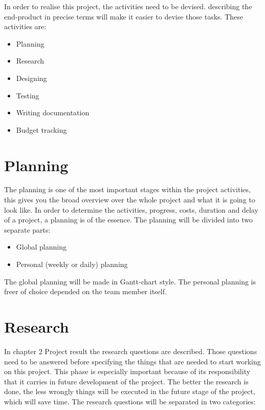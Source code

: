 In order to realise this project, the activities need to be devised. describing the end-product in precise terms will make it easier to devise those tasks. These activities are: 

\begin{itemize}
	\setlength\itemsep{-0.2em}
	\item Planning
	\item Research
	\item Designing
	\item Testing
	\item Writing documentation
	\item Budget tracking
\end{itemize}


	\section{Planning}
	
The planning is one of the most important stages within the project activities, this gives you the broad overview over the whole project and what it is going to look like. In order to determine the activities, progress, costs, duration and delay of a project, a planning is of the essence. 
The planning will be divided into two separate parts:

\begin{itemize}
	\setlength\itemsep{-0.2em}
	\item Global planning
	\item Personal (weekly or daily) planning
\end{itemize}

The global planning will be made in Gantt-chart style. The personal planning is freer of choice depended on the team member itself.
	
	
	\section{Research}
	
In chapter 2 Project result the research questions are described. Those questions need to be answered before specifying the things that are needed to start working on this project. This phase is especially important because of its responsibility that it carries in future development of the project. The better the research is done, the less wrongly things will be executed in the future stage of the project, which will save time. 
The research questions will be separated in two categories: 

